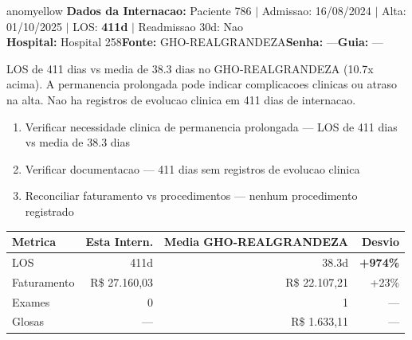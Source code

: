 \documentclass[a4paper,10pt]{article}
\begin{document}
\newpage

\begin{anomalycard}[Internacao 9512 | GHO-REALGRANDEZA | MODERADO (z=2.26)]{anomyellow}
\textbf{Dados da Internacao:} Paciente 786 $\mid$ Admissao: 16/08/2024 $\mid$ Alta: 01/10/2025 $\mid$ LOS: \textbf{411d} $\mid$ Readmissao 30d: Nao\\
\textbf{Hospital:} Hospital 258\quad\textbf{Fonte:} GHO-REALGRANDEZA\quad\textbf{Senha:} ---\quad\textbf{Guia:} ---\\
\vspace{2pt}\begin{tcolorbox}[colback=severityred!20,colframe=anomyellow,title={\textbf{Interpretacao de Negocio}},fonttitle=\bfseries\small,left=4pt,right=4pt,top=3pt,bottom=3pt]
{\small LOS de 411 dias vs media de 38.3 dias no GHO-REALGRANDEZA (10.7x acima). A permanencia prolongada pode indicar complicacoes clinicas ou atraso na alta. Nao ha registros de evolucao clinica em 411 dias de internacao.}
\end{tcolorbox}
\begin{tcolorbox}[colback=severityyellow!30,colframe=anomorange,title={\textbf{Recomendacoes Especificas}},fonttitle=\bfseries\small,left=4pt,right=4pt,top=3pt,bottom=3pt]
\begin{enumerate}[nosep,leftmargin=16pt]
\item {\small Verificar necessidade clinica de permanencia prolongada --- LOS de 411 dias vs media de 38.3 dias}
\item {\small Verificar documentacao --- 411 dias sem registros de evolucao clinica}
\item {\small Reconciliar faturamento vs procedimentos --- nenhum procedimento registrado}
\end{enumerate}
\end{tcolorbox}
\begin{center}\begin{tabular}{l r r r}\toprule\textbf{Metrica} & \textbf{Esta Intern.} & \textbf{Media GHO-REALGRANDEZA} & \textbf{Desvio} \\\midrule
LOS & 411d & 38.3d & \textcolor{anomred}{\textbf{+974\%}} \\
Faturamento & R\$ 27.160,03 & R\$ 22.107,21 & +23\% \\
Exames & 0 & 1 & --- \\
Glosas & --- & R\$ 1.633,11 & --- \\
\bottomrule\end{tabular}\end{center}


\end{anomalycard}
\end{document}
